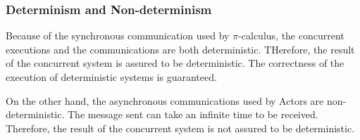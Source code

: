 



\subsubsection{Determinism and Non-determinism}


Because of the synchronous communication used by $\pi$-calculus, the concurrent executions and the communications are both deterministic.
THerefore, the result of the concurrent system is assured to be deterministic.
The correctness of the execution of deterministic systems is guaranteed.

On the other hand, the asynchronous communications used by Actors are non-deterministic.
The message sent can take an infinite time to be received.
Therefore, the result of the concurrent system is not assured to be deterministic.

